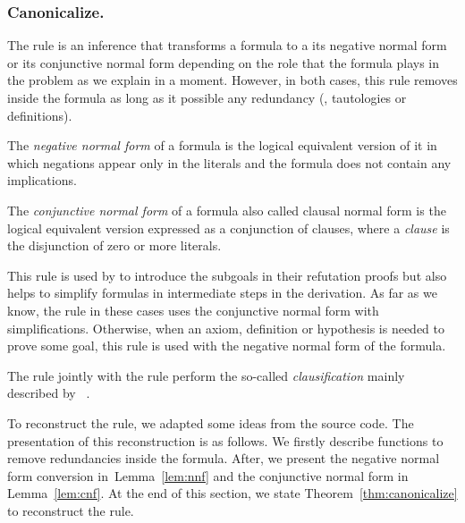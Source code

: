 \documentclass[../../main.tex]{subfiles}
\begin{document}
\subsubsection{Canonicalize.}
\label{sssec:canonicalize}

The \canonicalize rule is an inference that transforms a formula to a its
negative normal form or its conjunctive normal form depending on
the role that the formula plays in the problem as we explain in a moment.
However, in both cases, this rule removes inside the formula as long as it
possible any redundancy (\ie, tautologies or definitions).

\begin{mydefinition}
The \emph{negative normal form} of a formula is the logical equivalent version of it
in which negations appear only in the literals and the formula does not
contain any implications.

\end{mydefinition}

\begin{mydefinition}

The \emph{conjunctive normal form} of a formula also called clausal normal form
is the logical equivalent version expressed as a conjunction of clauses, where
a \emph{clause} is the disjunction of zero or more literals.

\end{mydefinition}

This rule is used by \Metis to introduce the subgoals in their refutation proofs
but also helps to simplify formulas in intermediate steps in the derivation. As
far as we know, the \canonicalize rule in these cases uses the conjunctive
normal form with simplifications. Otherwise, when an axiom, definition or
hypothesis is needed to prove some goal, this rule is used with the negative
normal form of the formula.

The \canonicalize rule jointly with the \clausify rule perform the so-called
\emph{clausification} mainly described by
\citeauthor{Sutcliffe1996}~\cite{Sutcliffe1996}.

To reconstruct the \canonicalize rule, we adapted some ideas from the \Metis
source code. The presentation of this reconstruction is as follows. We firstly
describe functions to remove redundancies inside the formula. After, we present
the negative normal form conversion in~Lemma~\ref{lem:nnf} and the conjunctive
normal form in Lemma~\ref{lem:cnf}. At the end of this section, we state
Theorem~\ref{thm:canonicalize} to reconstruct the \canonicalize rule.
\end{document}
